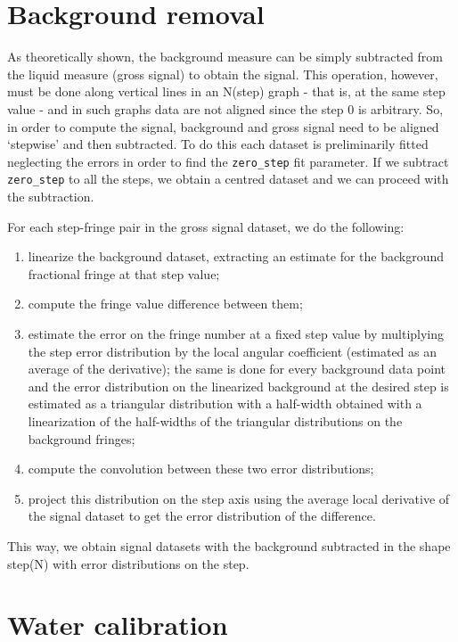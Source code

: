 \documentclass[a4paper, 12pt]{article}
\begin{document}
\section{Background removal}

As theoretically shown, the background measure can be simply subtracted from the liquid measure (gross signal) to obtain the signal. This operation, however, must be done along vertical lines in an N(step) graph - that is, at the same step value -  and in such graphs data are not aligned since the step 0 is arbitrary.
So, in order to compute the signal, background and gross signal need to be aligned ‘stepwise’ and then subtracted.
To do this each dataset is preliminarily fitted neglecting the errors in order to find the \lstinline{zero_step} fit parameter.
If we subtract \lstinline{zero_step} to all the steps, we obtain a centred dataset and we can proceed with the subtraction.

For each step-fringe pair in the gross signal dataset, we do the following:

\begin{enumerate}
  \item linearize the background dataset, extracting an estimate for the background fractional fringe at that step value;
  \item compute the fringe value difference between them;
  \item   estimate the error on the fringe number at a fixed step value by multiplying the step error distribution by the local angular coefficient (estimated as an average of the derivative); the same is done for every background data point and the error distribution on the linearized background at the desired step is estimated as a triangular distribution with a half-width obtained with a linearization of the half-widths of the triangular distributions on the background fringes;
  \item compute the convolution between these two error distributions;
  \item project this distribution on the step axis using the average local derivative of the signal dataset to get the error distribution of the difference.
\end{enumerate}

This way, we obtain signal datasets with the background subtracted in the shape step(N) with error distributions on the step.

\section{Water calibration}
\end{document}
